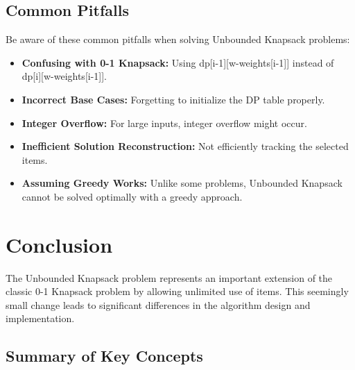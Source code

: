 \documentclass{article}
\begin{document}
\subsection{Common Pitfalls}

Be aware of these common pitfalls when solving Unbounded Knapsack problems:

\begin{itemize}[leftmargin=*]
    \item \textbf{Confusing with 0-1 Knapsack:} Using dp[i-1][w-weights[i-1]] instead of dp[i][w-weights[i-1]].
    
    \item \textbf{Incorrect Base Cases:} Forgetting to initialize the DP table properly.
    
    \item \textbf{Integer Overflow:} For large inputs, integer overflow might occur.
    
    \item \textbf{Inefficient Solution Reconstruction:} Not efficiently tracking the selected items.
    
    \item \textbf{Assuming Greedy Works:} Unlike some problems, Unbounded Knapsack cannot be solved optimally with a greedy approach.
\end{itemize}

\section{Conclusion}

The Unbounded Knapsack problem represents an important extension of the classic 0-1 Knapsack problem by allowing unlimited use of items. This seemingly small change leads to significant differences in the algorithm design and implementation.

\subsection{Summary of Key Concepts}
\end{document}
